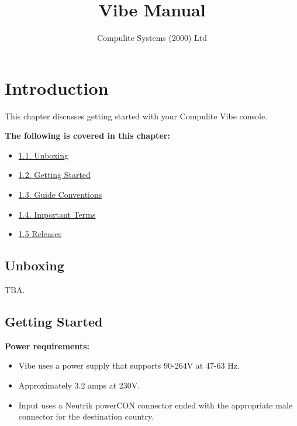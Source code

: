 \documentclass[
]{article}
\title{Vibe Manual}
\author{Compulite Systems (2000) Ltd}
\date{}
\providecommand{\tightlist}{%
  \setlength{\itemsep}{0pt}\setlength{\parskip}{0pt}}
\begin{document}
\maketitle

{
\setcounter{tocdepth}{2}
\tableofcontents
}
\hypertarget{introduction}{%
\section{Introduction}\label{introduction}}

This chapter discusses getting started with your Compulite Vibe console.

\textbf{The following is covered in this chapter:}

\begin{itemize}
\tightlist
\item
  \href{https://vibemanual.compulite.com/index.html\#unboxing}{1.1. Unboxing}
\item
  \href{https://vibemanual.compulite.com/index.html\#getting-started}{1.2. Getting Started}
\item
  \href{https://vibemanual.compulite.com/index.html\#guide-conventions}{1.3. Guide Conventions}
\item
  \href{https://vibemanual.compulite.com/index.html\#important-terms}{1.4. Important Terms}
\item
  \href{https://vibemanual.compulite.com/index.html\#releases}{1.5 Releases}
\end{itemize}

\hypertarget{unboxing}{%
\subsection{Unboxing}\label{unboxing}}

TBA.

\hypertarget{getting-started}{%
\subsection{Getting Started}\label{getting-started}}

\textbf{Power requirements:}

\begin{itemize}
\tightlist
\item
  Vibe uses a power supply that supports 90-264V at 47-63 Hz.
\item
  Approximately 3.2 amps at 230V.
\item
  Input uses a Neutrik powerCON connector ended with the appropriate male connector for the destination country.
\end{itemize}
\end{document}
